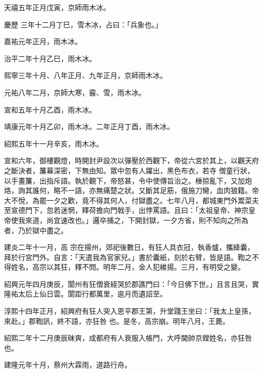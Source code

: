 \begin{pinyinscope}
 天禧五年正月戊寅，京師雨木冰。



 慶歷
 三年十二月丁巳，雪木冰，占曰：「兵象也。」



 嘉祐元年正月，雨木冰。



 治平二年十月乙巳，雨木冰。



 熙寧三年十月、八年正月、九年正月，京師雨木冰。



 元祐八年二月，京師大寒，霰、雪，雨木冰。



 宣和五年十月乙酉，雨木冰。



 靖康元年十月乙卯，雨木冰。二年正月丁酉，雨木冰。



 紹熙五年十一月辛亥，雨木冰。



 宣和六年，御樓觀燈，時開封尹設次以彈壓於西觀下，帝從六宮於其上，以觀天府之斷決者，簾幕深密，下無由知。眾中忽有人躍出，黑色布衣，若寺
 僧童行狀，以手畫簾，出指斥語。執於觀下，帝怒甚，令中使傳旨治之。棰掠亂下，又加炮烙，詢其誰何，略不一語，亦無痛楚之狀。又斷其足筋，俄施刀臠，血肉狼籍。帝大不悅，為罷一夕之歡，竟不得其何人，付獄盡之。七年八月，都城東門外鬻菜夫至宣德門下，忽若迷惘，釋荷擔向門戟手，出悖罵語。且曰：「太祖皇帝、神宗皇帝使我來道，尚宜速改也。」邏卒捕之，下開封獄，一夕方省，則不知向之所為者，乃於獄中盡之。



 建炎二年十一月，高
 宗在揚州，郊祀後數日，有狂人具衣冠，執香爐，攜絳囊，拜於行宮門外。自言：「天遣我為官家兒。」書於囊紙，刻於右臂，皆是語。鞫之不得姓名，高宗以其狂，釋不問。明年二月，金人犯維揚。三月，有明受之變。



 紹興元年四月庚辰，閬州有狂僧衰絰哭於郡譙門曰：「今日佛下世。」且言且哭，實隆祐太后上仙日雲。閬距行都萬里，逾月而遺詔至。



 淳熙十四年正月，紹興府有狂人突入恩平郡王第，升堂踐王坐曰：「我太上皇孫，來赴。」郡鞫訊，終不語，亦狂咎
 也。是冬，高宗崩。明年八月，王薨。



 紹熙二年十二月庚辰昧爽，成都府有人衰服入帳門，大呼閫帥京鏜姓名，亦狂咎也。



 建隆元年十月，蔡州大霖雨，道路行舟。




\end{pinyinscope}
